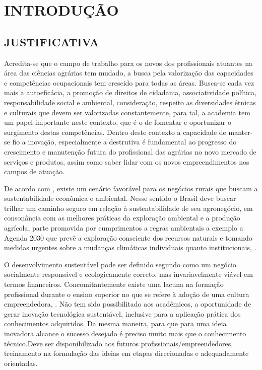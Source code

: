 \chapter{INTRODUÇÃO}

\section{JUSTIFICATIVA}

Acredita-se que o campo de trabalho para os novos dos profissionais atuantes na área das ciências agrárias tem mudado, a busca pela valorização das capacidades e competências ocupacionais tem crescido para todas as áreas. Busca-se cada vez mais a autoeficácia, a promoção de direitos de cidadania, associatividade política, responsabilidade social e ambiental, consideração, respeito as diversidades étnicas e culturais que devem ser valorizadas constantemente, para tal, a academia tem um papel importante neste contexto, que é o de fomentar e oportunizar o surgimento destas competências. Dentro deste contexto a capacidade de manter-se fio a inovação, especialmente a destrutiva é fundamental ao progresso do crescimento e manutenção futura do profissional das agrárias no novo mercado de serviços e produtos, assim como saber lidar com os novos empreendimentos nos campos de atuação.

De acordo com , existe um cenário favorável para os negócios rurais que buscam a sustentabilidade econômica e ambiental. Nesse sentido o Brasil deve buscar trilhar  um caminho seguro em relação à sustentabilidade de seu agronegócio, em consonância com as melhores práticas da exploração ambiental e a produção agrícola, parte promovida por cumprimentos a regras ambientais a exemplo a Agenda 2030 que prevê a exploração consciente dos recursos naturais e tomando medidas urgentes sobre a mudanças climáticas individuais quanto institucionais, \cite{filho_documentos_2017}.

O desenvolvimento sustentável pode ser definido segundo \cite{lara_ideologia_2017} como um negócio socialmente responsável e ecologicamente correto, mas invariavelmente viável em termos financeiros. Concomitantemente existe uma lacuna na formação profissional durante o ensino superior no que se refere à adoção de uma cultura empreendedora, \cite{lima_ser_2015}. Não tem sido possibilitado aos acadêmicos, a oportunidade de gerar inovação tecnológica sustentável, inclusive para a aplicação prática dos conhecimentos adquiridos. Da mesma maneira, para que para uma ideia inovadora alcance o sucesso desejado é preciso muito mais que o conhecimento técnico.Deve ser disponibilizado aos futuros profissionais/empreendedores, treinamento na formulação das ideias em etapas direcionadas e adequadamente orientadas.


